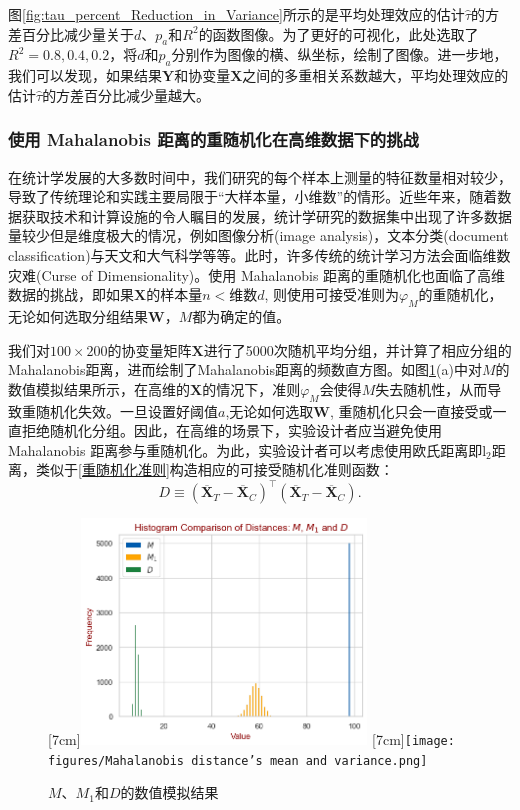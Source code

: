 图\ref{fig:tau_percent_Reduction_in_Variance}所示的是平均处理效应的估计$\hat{\tau}$的方差百分比减少量关于$d$、$p_a$和$R^2$的函数图像。为了更好的可视化，此处选取了$R^2=0.8, 0.4, 0.2$，将$d$和$p_a$分别作为图像的横、纵坐标，绘制了图像。进一步地，我们可以发现，如果结果$\mathbf{Y}$和协变量$\mathbf{X}$之间的多重相关系数越大，平均处理效应的估计$\hat{\tau}$的方差百分比减少量越大。

\subsubsection{使用 Mahalanobis 距离的重随机化在高维数据下的挑战}

在统计学发展的大多数时间中，我们研究的每个样本上测量的特征数量相对较少，导致了传统理论和实践主要局限于“大样本量，小维数”的情形。近些年来，随着数据获取技术和计算设施的令人瞩目的发展，统计学研究的数据集中出现了许多数据量较少但是维度极大的情况，例如图像分析(image analysis)，文本分类(document classification)与天文和大气科学等等\cite{johnstone2009statistical}。此时，许多传统的统计学习方法会面临维数灾难(Curse of Dimensionality)。使用 Mahalanobis 距离的重随机化也面临了高维数据的挑战，即如果$\mathbf{X}$的$\text{样本量}n <\text{维数}d$, 则使用可接受准则为$\varphi_M$的重随机化，无论如何选取分组结果$\mathbf{W}$，$M$都为确定的值。

我们对$100\times 200$的协变量矩阵$\mathbf{X}$进行了5000次随机平均分组，并计算了相应分组的Mahalanobis距离，进而绘制了Mahalanobis距离的频数直方图。如图\ref{fig:different Distance}(a)中对$M$的数值模拟结果所示，在高维的$\mathbf{X}$的情况下，准则$\varphi_M$会使得$M$失去随机性，从而导致重随机化失效。一旦设置好阈值$a$,无论如何选取$\mathbf{W}$, 重随机化只会一直接受或一直拒绝随机化分组。因此，在高维的场景下，实验设计者应当避免使用 Mahalanobis 距离参与重随机化。为此，实验设计者可以考虑使用欧氏距离即$\mathrm{l}_2$距离，类似于\ref{重随机化准则}构造相应的可接受随机化准则函数：
\begin{equation}
    D  \equiv\left(\overline{\mathbf{X}}_T-\overline{\mathbf{X}}_C\right)^{\top}\left(\overline{\mathbf{X}}_T-\overline{\mathbf{X}}_C\right). 
\end{equation}

\begin{figure}[!hbtp]
  \centering
                [7cm]{\includegraphics[height=6cm]{figures/differentDistance.png}}
  \hspace{1cm}
                [7cm]{\texttt{[image: figures/Mahalanobis distance’s mean and variance.png]}}
  \caption{$M$、$M_1$和$D$的数值模拟结果}
  \label{fig:different Distance}
\end{figure}

